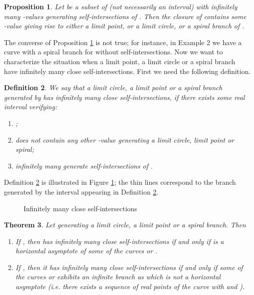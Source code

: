 \documentclass{elsart}
\newtheorem{theorem}{{\bf Theorem}}
\newtheorem{definition}[theorem]{{\bf Definition}}
\newtheorem{proposition}[theorem]{{\bf Proposition}}
\begin{document}
\begin{proposition} \label{limit-self-int}
Let  be a subset of  (not necessarily an interval) with infinitely many -values generating self-intersections of
. Then the closure of  contains some -value giving rise to either a limit point, or a limit circle, or a spiral branch of .
\end{proposition}



The converse of Proposition \ref{limit-self-int} is not true; for instance, in Example 2 we have a curve with a spiral branch for
 without self-intersections. Now we want to characterize the situation when a limit point, a limit circle or a spiral branch have infinitely many close self-intersections. First we need the following definition.

\begin{definition} \label{close-inf}
We say that a limit circle, a limit point or a spiral branch generated by
 has {\sf infinitely many close self-intersections}, if there exists some real interval  verifying:
\begin{enumerate}
\item ;
\item   does not contain any other -value generating a limit circle, limit point or spiral;
\item  infinitely many  generate self-intersections of .
\end{enumerate}
\end{definition}

Definition \ref{close-inf} is illustrated in Figure \ref{imcs}; the thin lines correspond to the branch generated by the interval  appearing in Definition \ref{close-inf}.

\begin{figure}[ht]
\begin{center}
\centerline{}
\end{center}
\caption{Infinitely many close self-intersections}\label{imcs}
\end{figure}




\begin{theorem} \label{th-self-assoc}
Let  generating a limit circle, a limit point or a spiral branch. Then
\begin{enumerate}
\item If , then  has infinitely many close self-intersections if and only if  is a horizontal asymptote of some of the curves  or .
\item  If , then it has infinitely many close self-intersections if and only if some of the curves  or  exhibits an infinite branch as  which is not  a horizontal
asymptote (i.e. there exists a sequence of real points  of the curve with  and ).
\end{enumerate}
\end{theorem}
\end{document}
